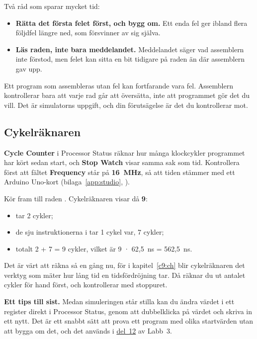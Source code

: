 Två råd som sparar mycket tid:
\begin{itemize}
  \item \textbf{Rätta det första felet först, och bygg om.} Ett enda fel ger ibland flera följdfel
    längre ned, som försvinner av sig själva.
  \item \textbf{Läs raden, inte bara meddelandet.} Meddelandet säger vad assemblern inte förstod,
    men felet kan sitta en bit tidigare på raden än där assemblern gav upp.
\end{itemize}

Ett program som assembleras utan fel kan fortfarande vara fel. Assemblern kontrollerar bara att
varje rad går att översätta, inte att programmet gör det du vill. Det är simulatorns uppgift, och
din förutsägelse är det du kontrollerar mot.

\subsection{Cykelräknaren}
\label{c7:c5}
\textbf{Cycle Counter} i Processor Status räknar hur många klockcykler programmet har kört sedan
start, och \textbf{Stop Watch} visar samma sak som tid. Kontrollera först att fältet
\textbf{Frequency} står på \textbf{16~MHz}, så att tiden stämmer med ett Arduino Uno-kort
(bilaga~\ref{app:studio}, ).

Kör  fram till raden . Cykelräknaren visar då \textbf{9}:
\begin{itemize}
  \item {} tar 2 cykler;
  \item de sju instruktionerna i  tar 1 cykel var, 7 cykler;
  \item totalt 2 + 7 = 9 cykler, vilket är 9 · 62,5~ns = 562,5~ns.
\end{itemize}

Det är värt att räkna så en gång nu, för i kapitel~\ref{c9:ch} blir cykelräknaren det verktyg som
mäter hur lång tid en tidsfördröjning tar. Då räknar du ut antalet cykler för hand först, och
kontrollerar med stoppuret.

\textbf{Ett tips till sist.} Medan simuleringen står stilla kan du ändra värdet i ett register
direkt i Processor Status, genom att dubbelklicka på värdet och skriva in ett nytt. Det är ett
snabbt sätt att prova ett program med olika startvärden utan att bygga om det, och det används i
\hyperref[lab3:d12]{del~12} av Labb~3.
